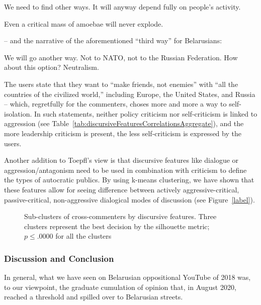 \begin{displayquote}
	We need to find other ways. It will anyway depend fully on people’s activity.
\end{displayquote}

\begin{displayquote}
	Even a critical mass of amoebae will never explode.
\end{displayquote}

-- and the narrative of the aforementioned “third way” for Belarusians:

\begin{displayquote}
	We will go another way. Not to NATO, not to the Russian Federation. How about this option? Neutralism.
\end{displayquote}

The users state that they want to “make friends, not enemies” with “all the countries of the civilized world,” including Europe, the United States, and Russia -- which, regretfully for the commenters, choses more and more a way to self-isolation. In such statements, neither policy criticism nor self-criticism is linked to aggression (see Table~\cref{tab:discursiveFeaturesCorrelationsAggregate}), and the more leadership criticism is present, the less self-criticism is expressed by the users.

Another addition to Toepfl’s view is that discursive features like dialogue or aggression/antagonism need to be used in combination with criticism to define the types of autocratic publics. By using k-means clustering, we have shown that these features allow for seeing difference between actively aggressive-critical, passive-critical, non-aggressive dialogical modes of discussion (see Figure~\cref{label}).

\begin{figure}[ht]
	\caption{Sub-clusters of cross-commenters by discursive features. Three clusters represent the best decision by the silhouette metric; \(p \le .0000\) for all the clusters}\label{fig:crossCommentersSubClusters}
\end{figure}

\subsubsection{Discussion and Conclusion}

In general, what we have seen on Belarusian oppositional YouTube of 2018 was, to our viewpoint, the graduate cumulation of opinion that, in August 2020, reached a threshold and spilled over to Belarusian streets.

